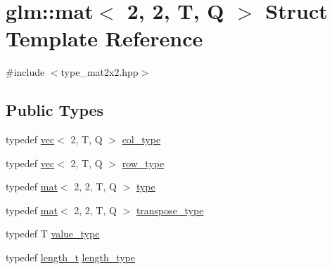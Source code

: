 \hypertarget{structglm_1_1mat_3_012_00_012_00_01_t_00_01_q_01_4}{}\section{glm\+:\+:mat$<$ 2, 2, T, Q $>$ Struct Template Reference}
\label{structglm_1_1mat_3_012_00_012_00_01_t_00_01_q_01_4}


{\ttfamily \#include $<$type\+\_\+mat2x2.\+hpp$>$}

\subsection*{Public Types}
\begin{DoxyCompactItemize}
\item 
typedef \hyperlink{structglm_1_1vec}{vec}$<$ 2, T, Q $>$ \hyperlink{structglm_1_1mat_3_012_00_012_00_01_t_00_01_q_01_4_a2983591534ee443dd378cedcbe771749}{col\+\_\+type}
\item 
typedef \hyperlink{structglm_1_1vec}{vec}$<$ 2, T, Q $>$ \hyperlink{structglm_1_1mat_3_012_00_012_00_01_t_00_01_q_01_4_a362ebaadd84b755d779b8f35dbaa5ba9}{row\+\_\+type}
\item 
typedef \hyperlink{structglm_1_1mat}{mat}$<$ 2, 2, T, Q $>$ \hyperlink{structglm_1_1mat_3_012_00_012_00_01_t_00_01_q_01_4_ac6dc94bb53f4e93c806d3b38cbf9172c}{type}
\item 
typedef \hyperlink{structglm_1_1mat}{mat}$<$ 2, 2, T, Q $>$ \hyperlink{structglm_1_1mat_3_012_00_012_00_01_t_00_01_q_01_4_a9635a76e3f23ca6da671e913dfd23bfd}{transpose\+\_\+type}
\item 
typedef T \hyperlink{structglm_1_1mat_3_012_00_012_00_01_t_00_01_q_01_4_a6bd6b4c0d4bf7dff724cc03096b92d40}{value\+\_\+type}
\item 
typedef \hyperlink{namespaceglm_a090a0de2260835bee80e71a702492ed9}{length\+\_\+t} \hyperlink{structglm_1_1mat_3_012_00_012_00_01_t_00_01_q_01_4_a96c65b091fc8fe8e6f5637e30c9c1f81}{length\+\_\+type}
\end{DoxyCompactItemize}
